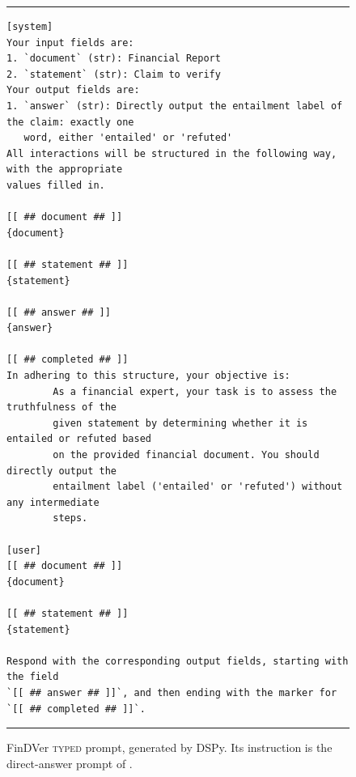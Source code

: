 \documentclass[11pt]{article}
\newcommand{\typed}{\textsc{typed}}
\begin{document}
\begin{figure}[H]
\centering
\begin{minipage}{0.92\textwidth}
\footnotesize
\hrule\vspace{4pt}
\begin{verbatim}
[system]
Your input fields are:
1. `document` (str): Financial Report
2. `statement` (str): Claim to verify
Your output fields are:
1. `answer` (str): Directly output the entailment label of the claim: exactly one
   word, either 'entailed' or 'refuted'
All interactions will be structured in the following way, with the appropriate
values filled in.

[[ ## document ## ]]
{document}

[[ ## statement ## ]]
{statement}

[[ ## answer ## ]]
{answer}

[[ ## completed ## ]]
In adhering to this structure, your objective is:
        As a financial expert, your task is to assess the truthfulness of the
        given statement by determining whether it is entailed or refuted based
        on the provided financial document. You should directly output the
        entailment label ('entailed' or 'refuted') without any intermediate
        steps.

[user]
[[ ## document ## ]]
{document}

[[ ## statement ## ]]
{statement}

Respond with the corresponding output fields, starting with the field
`[[ ## answer ## ]]`, and then ending with the marker for `[[ ## completed ## ]]`.
\end{verbatim}
\vspace{2pt}\hrule
\end{minipage}
\caption{FinDVer \typed{} prompt, generated by DSPy. Its instruction is
the direct-answer prompt of \citet{zhao-etal-2024-findver}.}
\label{fig:prompt_fv_typed}
\end{figure}
\end{document}
